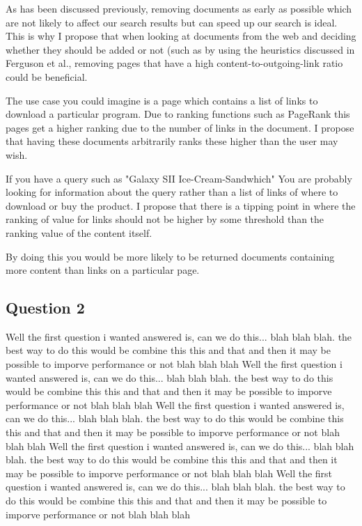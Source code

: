 \documentclass{acm_proc_article-sp}
\begin{document}
As has been discussed previously, removing documents as early as possible which are not likely to affect our search results but can speed up our search is ideal. This is why I propose that when looking at documents from the web and deciding whether they should be added or not (such as by using the heuristics discussed in Ferguson et al., removing pages that have a high content-to-outgoing-link ratio could be beneficial.

The use case you could imagine is a page which contains a list of links to download a particular program. Due to ranking functions such as PageRank this pages get a higher ranking due to the number of links in the document. I propose that having these documents arbitrarily ranks these higher than the user may wish.

If you have a query such as "Galaxy SII Ice-Cream-Sandwhich" You are probably looking for information about the query rather than a list of links of where to download or buy the product. I propose that there is a tipping point in where the ranking of value for links should not be higher by some threshold than the ranking value of the content itself.

By doing this you would be more likely to be returned documents containing more content than links on a particular page.

\subsection{Question 2}
Well the first question i wanted answered is, can we do this... blah blah blah. the best way to do this would be combine this this and that and then it may be possible to imporve performance or not blah blah blah
Well the first question i wanted answered is, can we do this... blah blah blah. the best way to do this would be combine this this and that and then it may be possible to imporve performance or not blah blah blah
Well the first question i wanted answered is, can we do this... blah blah blah. the best way to do this would be combine this this and that and then it may be possible to imporve performance or not blah blah blah
Well the first question i wanted answered is, can we do this... blah blah blah. the best way to do this would be combine this this and that and then it may be possible to imporve performance or not blah blah blah
Well the first question i wanted answered is, can we do this... blah blah blah. the best way to do this would be combine this this and that and then it may be possible to imporve performance or not blah blah blah
\end{document}
